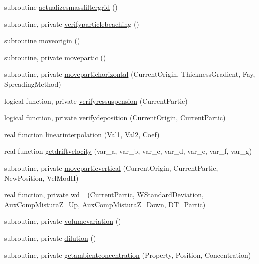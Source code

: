 \begin{DoxyCompactItemize}
\item 
subroutine \mbox{\hyperlink{namespacemodulelagrangian_ab69c4015dc76dd2209a1eda6139be71f}{actualizesmassfiltergrid}} ()
\item 
subroutine, private \mbox{\hyperlink{namespacemodulelagrangian_abaac5c633b5d8d05a11c32bbee80acaa}{verifyparticlebeaching}} ()
\item 
subroutine \mbox{\hyperlink{namespacemodulelagrangian_a56e2a0655f742104a77b7d6d4040508f}{moveorigin}} ()
\item 
subroutine, private \mbox{\hyperlink{namespacemodulelagrangian_ad9212277994fb1a55e17c7e17d66aabc}{movepartic}} ()
\item 
subroutine, private \mbox{\hyperlink{namespacemodulelagrangian_a9117067712a5138b783af1e0e971235f}{movepartichorizontal}} (Current\+Origin, Thickness\+Gradient, Fay, Spreading\+Method)
\item 
logical function, private \mbox{\hyperlink{namespacemodulelagrangian_af983501fcd8d5abbf81124ad3229d435}{verifyressuspension}} (Current\+Partic)
\item 
logical function, private \mbox{\hyperlink{namespacemodulelagrangian_a707d19136d3ce2d287f6e476d28385c8}{verifydeposition}} (Current\+Origin, Current\+Partic)
\item 
real function \mbox{\hyperlink{namespacemodulelagrangian_a0c6b41e19230933d9b189208e04909f1}{linearinterpolation}} (Val1, Val2, Coef)
\item 
real function \mbox{\hyperlink{namespacemodulelagrangian_a4fe5e7ff4efbd8464e9c64ac12f53a3c}{getdriftvelocity}} (var\+\_\+a, var\+\_\+b, var\+\_\+c, var\+\_\+d, var\+\_\+e, var\+\_\+f, var\+\_\+g)
\item 
subroutine, private \mbox{\hyperlink{namespacemodulelagrangian_aee1cf00f54feae6409c4674532876dcc}{moveparticvertical}} (Current\+Origin, Current\+Partic, New\+Position, Vel\+ModH)
\item 
real function, private \mbox{\hyperlink{namespacemodulelagrangian_a017fc1ab12cc04b5c4839d5ea0b54365}{wd\+\_\+}} (Current\+Partic, W\+Standard\+Deviation, Aux\+Comp\+Mistura\+Z\+\_\+\+Up, Aux\+Comp\+Mistura\+Z\+\_\+\+Down, D\+T\+\_\+\+Partic)
\item 
subroutine, private \mbox{\hyperlink{namespacemodulelagrangian_aac3ffc27a32f64e9bc13d06c25227655}{volumevariation}} ()
\item 
subroutine, private \mbox{\hyperlink{namespacemodulelagrangian_af886fd4c925246d6362ab14b2bfdcff1}{dilution}} ()
\item 
subroutine, private \mbox{\hyperlink{namespacemodulelagrangian_a379f0c8ed7aad4570a94ad678e1dea6e}{getambientconcentration}} (Property, Position, Concentration)

\end{DoxyCompactItemize}
